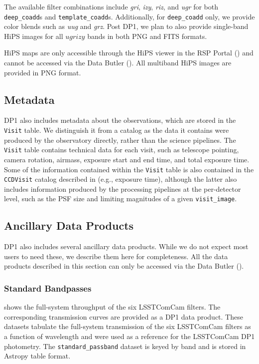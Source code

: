 The available filter combinations include \textit{gri}, \textit{izy}, \textit{riz}, and \textit{ugr} for both \texttt{deep\_coadd}s and \texttt{template\_coadd}s.
Additionally, for \texttt{deep\_coadd} only, we provide color blends such as \textit{uug} and \textit{grz}.
Post \gls{DP1}, we plan to also provide single-band HiPS images for all $ugrizy$ bands in both \gls{PNG} and \gls{FITS} formats.

\gls{HiPS} maps are only accessible through the \gls{HiPS} viewer in the \gls{RSP} Portal () and cannot be accessed via the Data \gls{Butler} ().
All multiband \gls{HiPS} images are provided in \gls{PNG} format.

\subsection{Metadata}
\label{ssec:metadata}
\gls{DP1} also includes \gls{metadata} about the observations, which are stored in the \texttt{Visit} table.
We distinguish it from a catalog as the data it contains were produced by the observatory directly, rather than the science pipelines.
The \texttt{Visit} table contains technical data for each visit, such as telescope pointing, camera rotation, \gls{airmass}, exposure start and end time, and total exposure time.
Some of the information contained within the \texttt{Visit} table is also contained in the \texttt{CCDVisit} catalog described in  (e.g., exposure time), although the latter also includes information produced by the processing pipelines at the per-detector level, such as the PSF size and limiting magnitudes of a given \texttt{visit\_image}.

\subsection{Ancillary Data Products}
\label{ssec:ancilliary}
\gls{DP1} also includes several ancillary data products.
While we do not expect most users to need these, we describe them here for completeness.
All the data products described in this section can only be accessed via the Data Butler ().

\subsubsection{Standard Bandpasses}
\label{sssec:transmission_curves}
 shows the full-system throughput of the six \gls{LSSTComCam} filters.
The corresponding transmission curves are provided as a \gls{DP1} data product.
These datasets tabulate the full-system transmission of the six \gls{LSSTComCam} filters as a function of wavelength and were used as a reference for the \gls{LSSTComCam} \gls{DP1} photometry. The \texttt{standard\_passband} dataset is keyed by band and is stored in Astropy table format.

